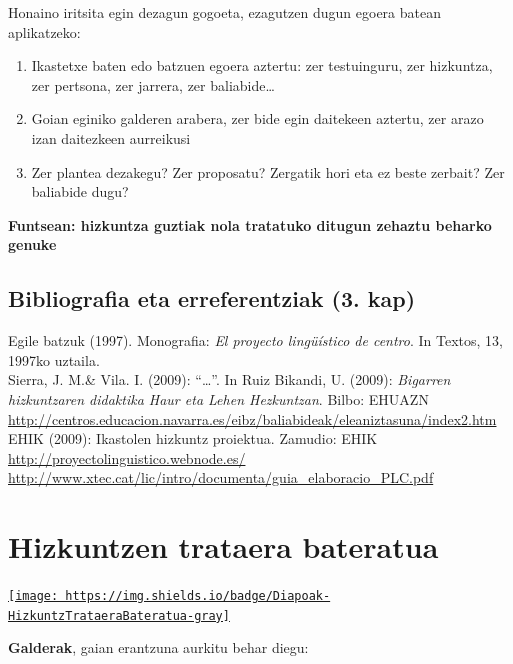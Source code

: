 \documentclass[
]{book}
\providecommand{\tightlist}{%
  \setlength{\itemsep}{0pt}\setlength{\parskip}{0pt}}
\begin{document}
Honaino iritsita egin dezagun gogoeta, ezagutzen dugun egoera batean aplikatzeko:

\begin{enumerate}
\def\labelenumi{\arabic{enumi}.}
\tightlist
\item
  Ikastetxe baten edo batzuen egoera aztertu: zer testuinguru, zer hizkuntza, zer pertsona, zer jarrera, zer baliabide\ldots{}
\item
  Goian eginiko galderen arabera, zer bide egin daitekeen aztertu, zer arazo izan daitezkeen aurreikusi
\item
  Zer plantea dezakegu? Zer proposatu? Zergatik hori eta ez beste zerbait? Zer baliabide dugu?
\end{enumerate}

\textbf{Funtsean: hizkuntza guztiak nola tratatuko ditugun zehaztu beharko genuke}

\hypertarget{bibliografia-eta-erreferentziak-3.-kap}{%
\section{Bibliografia eta erreferentziak (3. kap)}\label{bibliografia-eta-erreferentziak-3.-kap}}

Egile batzuk (1997). Monografia: \emph{El proyecto lingüístico de centro}. In Textos, 13, 1997ko uztaila.\\
Sierra, J. M.\& Vila. I. (2009): ``\ldots{}''. In Ruiz Bikandi, U. (2009): \emph{Bigarren hizkuntzaren didaktika Haur eta Lehen Hezkuntzan}. Bilbo: EHUAZN\\
\url{http://centros.educacion.navarra.es/eibz/baliabideak/eleaniztasuna/index2.htm}~\\
EHIK (2009): Ikastolen hizkuntz proiektua. Zamudio: EHIK\\
\url{http://proyectolinguistico.webnode.es/}~\\
\url{http://www.xtec.cat/lic/intro/documenta/guia_elaboracio_PLC.pdf}

\hypertarget{hizkuntzen-trataera-bateratua}{%
\chapter{Hizkuntzen trataera bateratua}\label{hizkuntzen-trataera-bateratua}}

\href{../diapoak/4-gaia-HTB.pdf}{\texttt{[image: https://img.shields.io/badge/Diapoak-HizkuntzTrataeraBateratua-gray]}}

\textbf{Galderak}, gaian erantzuna aurkitu behar diegu:
\end{document}

